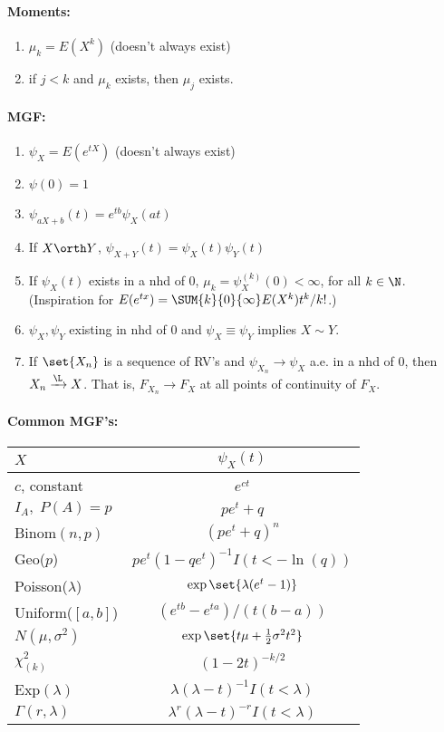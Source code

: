\documentclass[10pt]{article}
\begin{document}
\begin{multicols}{2}
\paragraph{Moments:}
\begin{enumerate}
\item $\mu_{k} = E(X^{k})$ (doesn't always exist)
\item if $j < k$ and $\mu_{k}$ exists, then $\mu_{j}$ exists. 
\end{enumerate}

\paragraph{MGF:}
\begin{enumerate}
\item $\psi_{X} = E(e^{tX})$ (doesn't always exist)
\item $\psi(0) = 1$
\item $\psi_{aX+b}(t) = e^{tb}\psi_{X}(at)$
\item If $X \orth Y$, $\psi_{X+Y}(t) = \psi_{X}(t) \psi_{Y}(t)$
\item If $\psi_{X}(t)$ exists in a nhd of 0, $\mu_{k} = \psi_{X}^{(k)}(0) < \infty$, for all $k \in \N$. (Inspiration for $E(e^{tx}) = \SUM{k}{0}{\infty} E(X^{k}) t^{k}/k!$.)
\item $\psi_{X}, \psi_{Y}$ existing in nhd of 0 and $\psi_{X} \equiv \psi_{Y}$ implies $X \sim Y$. 
\item If $\set{X_n}$ is a sequence of RV's and $\psi_{X_n} \to \psi_{X}$ a.e. in a nhd of 0, then $X_n \xrightarrow{\L} X$. That is, $F_{X_n} \to F_{X}$ at all points of continuity of $F_{X}$.
\end{enumerate}

\paragraph{Common MGF's:}
\begin{center}
\begin{tabular}{l|c}
$X$ & $\psi_{X}(t)$ \\
\hline %
$c$, constant & $e^{ct}$ \\
$I_{A}, \; P(A) = p$ & $p{e^{t}} + q$ \\
Binom$(n,p)$ & $(pe^t + q)^n$ \\
Geo($p$) & $p e^{t}(1-qe^t)^{-1} I(t < -\ln(q))$ \\
Poisson($\lambda$) & $\exp\set{\lambda(e^{t}-1)}$ \\
Uniform($[a,b]$) & $(e^{tb}-e^{ta})/(t(b-a))$ \\
$N(\mu,\sigma^2)$ & $\exp\set{t\mu + \frac{1}{2}\sigma^2t^2}$ \\ 
$\chi_{(k)}^{2}$ & $(1-2t)^{-k/2}$ \\
Exp$(\lambda)$ & $\lambda(\lambda-t)^{-1} I(t < \lambda)$ \\
$\Gamma(r,\lambda)$ & $\lambda^{r}(\lambda-t)^{-r} I(t < \lambda)$
\end{tabular}
\end{center}


\end{multicols}
\end{document}
